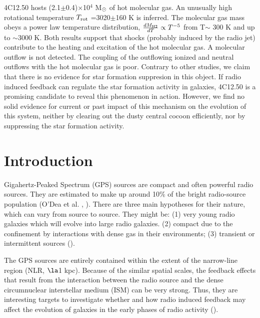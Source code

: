 \documentclass{aa}
\begin{document}
{4C12.50 hosts  (2.1$\pm$0.4)$\times$10$^{4}$ M$_{\rm \odot}$ of hot molecular gas. An unusually high rotational temperature $T_{\rm rot}$ =3020$\pm$160 K is inferred. The molecular gas mass obeys  a power law temperature distribution, $\frac{d M_{\rm H2}}{dT}\propto T^{-5}$  from T$\sim$ 300 K and up to  $\sim$3000 K.  Both results support that shocks (probably induced by the radio jet) contribute to the heating and excitation of the hot molecular gas.  A  molecular outflow is not detected. The  coupling of the outflowing ionized and neutral outflows with the  hot molecular gas is poor. Contrary to other studies, we claim that there is  no evidence for star formation suppresion in this object.}
{If radio induced feedback can regulate the star formation activity in galaxies, 4C12.50 is a promising candidate to reveal this phenomenon in action.  However, we find   no solid evidence for current or past impact of this mechanism on the evolution of this system, neither by clearing out the dusty central cocoon efficiently, nor by suppressing the star formation activity.}



\maketitle



\section{Introduction}
\label{intro}


Gigahertz-Peaked Spectrum (GPS) sources are compact and often powerful radio sources. They  are estimated to  make up around 10\%   of the bright radio-source population (O'Dea et al. \citeyear{ODea1998,ODea2021}, \citealt{Sadler2016}). There are three main hypotheses for their nature, which can vary from source to source. They might be: (1)   very young radio galaxies which will evolve into  large radio galaxies. (2) compact due to the confinement  by interactions with dense gas in their environments;  (3)  transient or intermittent sources (\citealt{ODea2021}).

The GPS sources are entirely contained within the extent of the narrow-line region (NLR, $\la$1 kpc). 
Because of the similar spatial scales, the feedback effects that result from the interaction between the radio source and the dense circumnuclear interstellar medium (ISM) can be very strong. Thus, they are interesting targets to investigate whether and how radio induced feedback may affect the evolution of galaxies in the early phases of radio activity (\citealt{ODea1998,Holt2003,Holt2011,Morganti2013,Santoro2020}).
\end{document}
